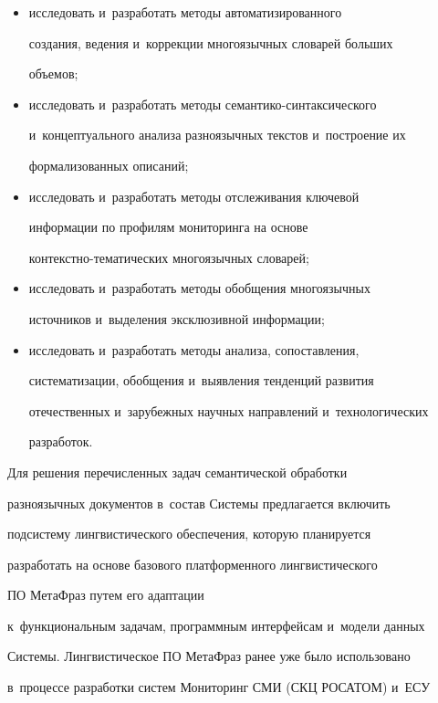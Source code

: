 \begin{itemize}
и~смысловых ассоциативных связей между ними);


\item исследовать и~разработать методы автоматизированного 


создания, ведения и~коррекции многоязычных словарей больших 


объемов;


\item исследовать и~разработать методы семантико-син\-так\-си\-че\-ско\-го 


и~концептуального анализа разноязычных текстов и~построение их 


формализованных описаний;


\item исследовать и~разработать методы отслеживания ключевой 


информации по профилям мониторинга на основе  


контекстно-тематических многоязычных словарей;


\item исследовать и~разработать методы обобщения многоязычных 


источников и~выделения эксклюзивной информации;


\item исследовать и~разработать методы анализа, сопоставления, 


систематизации, обобщения и~выявления тенденций развития 


отечественных и~зарубежных научных направлений и~технологических 


разработок.


\end{itemize}





     Для решения перечисленных задач семантической обработки 


разноязычных документов в~состав Системы предлагается включить 


подсистему лингвистического обеспечения, которую планируется 


разработать на основе базового платформенного лингвистического 


ПО МетаФраз путем его адаптации 


к~функциональным задачам, программным интерфейсам и~модели данных 


Системы. Лингвистическое ПО МетаФраз ранее уже было использовано 


в~процессе разработки систем Мониторинг СМИ (СКЦ РОСАТОМ) и~ЕСУ 


